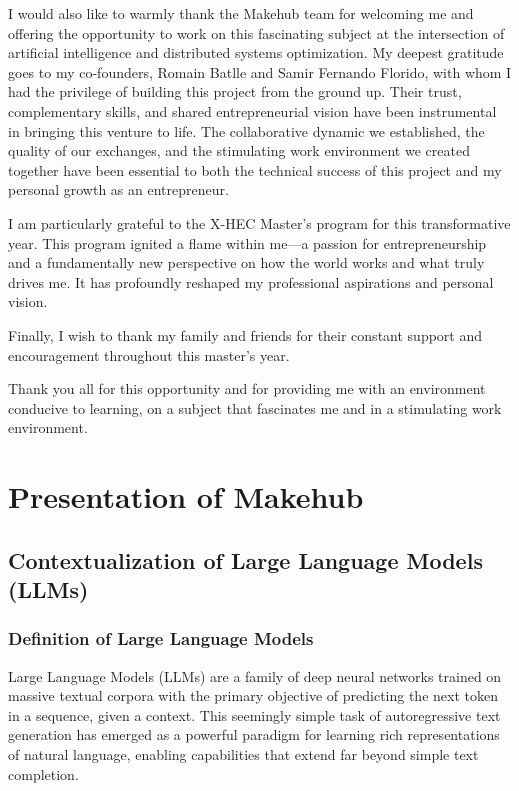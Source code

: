 \documentclass[english]{article}
\begin{document}
I would also like to warmly thank the Makehub team for welcoming me and offering the opportunity to work on this fascinating subject at the intersection of artificial intelligence and distributed systems optimization. My deepest gratitude goes to my co-founders, Romain Batlle and Samir Fernando Florido, with whom I had the privilege of building this project from the ground up. Their trust, complementary skills, and shared entrepreneurial vision have been instrumental in bringing this venture to life. The collaborative dynamic we established, the quality of our exchanges, and the stimulating work environment we created together have been essential to both the technical success of this project and my personal growth as an entrepreneur.

I am particularly grateful to the X-HEC Master's program for this transformative year. This program ignited a flame within me—a passion for entrepreneurship and a fundamentally new perspective on how the world works and what truly drives me. It has profoundly reshaped my professional aspirations and personal vision.

Finally, I wish to thank my family and friends for their constant support and encouragement throughout this master's year.

\bigskip

Thank you all for this opportunity and for providing me with an environment conducive to learning, on a subject that fascinates me and in a stimulating work environment.

\newpage
\tableofcontents
\newpage
\listoffigures

\newpage

\section{Presentation of Makehub}

\subsection{Contextualization of Large Language Models (LLMs)}

\subsubsection{Definition of Large Language Models}

Large Language Models (LLMs) are a family of deep neural networks trained on massive textual corpora with the primary objective of predicting the next token in a sequence, given a context. This seemingly simple task of autoregressive text generation has emerged as a powerful paradigm for learning rich representations of natural language, enabling capabilities that extend far beyond simple text completion.
\end{document}
